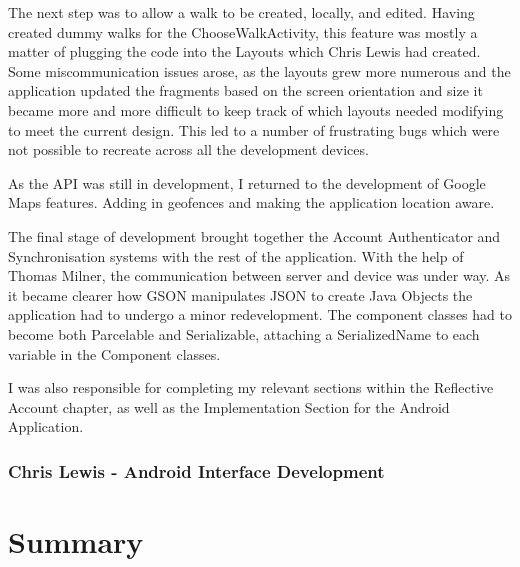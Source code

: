 \documentclass[11pt,a4paper]{report}
\begin{document}
The next step was to allow a walk to be created, locally, and edited. Having created dummy walks for the ChooseWalkActivity, this feature was mostly a matter of plugging the code into the Layouts which Chris Lewis had created. Some miscommunication issues arose, as the layouts grew more numerous and the application updated the fragments based on the screen orientation and size it became more and more difficult to keep track of which layouts needed modifying to meet the current design. This led to a number of frustrating bugs which were not possible to recreate across all the development devices.

As the API was still in development, I returned to the development of Google Maps features. Adding in geofences and making the application location aware.

The final stage of development brought together the Account Authenticator and Synchronisation systems with the rest of the application. With the help of Thomas Milner, the communication between server and device was under way. As it became clearer how GSON manipulates JSON to create Java Objects the application had to undergo a minor redevelopment. The component classes had to become both Parcelable and Serializable, attaching a SerializedName to each variable in the Component classes.

I was also responsible for completing my relevant sections within the Reflective Account chapter, as well as the Implementation Section for the Android Application.

\subsection{Chris Lewis - Android Interface Development}

\chapter*{Summary}
\label{sec:summary}
\newpage

\newpage



\appendix
\end{document}
